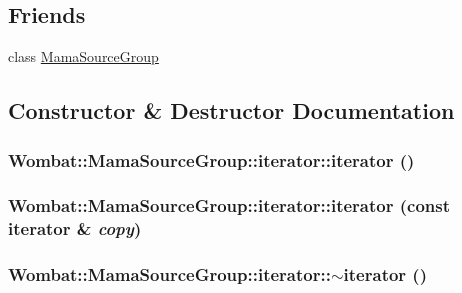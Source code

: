 \subsection*{Friends}
\begin{DoxyCompactItemize}
\item 
class \hyperlink{classWombat_1_1MamaSourceGroup_1_1iterator_a82189bc8b28cfa12074ed8afcd398469}{MamaSourceGroup}
\end{DoxyCompactItemize}


\subsection{Constructor \& Destructor Documentation}
\hypertarget{classWombat_1_1MamaSourceGroup_1_1iterator_aed54a3951d39b8527bbf2d7ada87612b}{
\subsubsection[{iterator}]{\setlength{\rightskip}{0pt plus 5cm}Wombat::MamaSourceGroup::iterator::iterator ()}}
\label{classWombat_1_1MamaSourceGroup_1_1iterator_aed54a3951d39b8527bbf2d7ada87612b}
\hypertarget{classWombat_1_1MamaSourceGroup_1_1iterator_a59e193a9e699677c09583b1e8996e25a}{
\subsubsection[{iterator}]{\setlength{\rightskip}{0pt plus 5cm}Wombat::MamaSourceGroup::iterator::iterator (const {\bf iterator} \& {\em copy})}}
\label{classWombat_1_1MamaSourceGroup_1_1iterator_a59e193a9e699677c09583b1e8996e25a}
\hypertarget{classWombat_1_1MamaSourceGroup_1_1iterator_a45898520df782e282f422711f914aa3a}{
\subsubsection[{$\sim$iterator}]{\setlength{\rightskip}{0pt plus 5cm}Wombat::MamaSourceGroup::iterator::$\sim$iterator ()}}
\label{classWombat_1_1MamaSourceGroup_1_1iterator_a45898520df782e282f422711f914aa3a}


